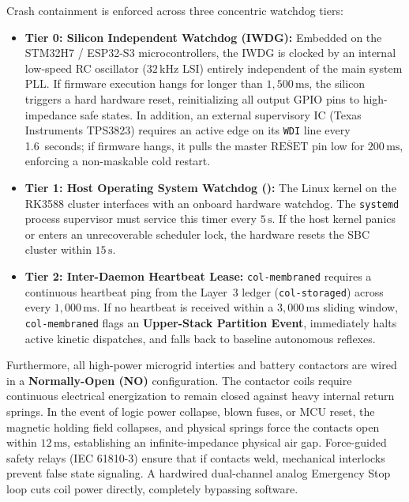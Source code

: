 Crash containment is enforced across three concentric watchdog tiers:
\begin{itemize}
    \item \textbf{Tier 0: Silicon Independent Watchdog (IWDG):} Embedded on the STM32H7 / ESP32-S3 microcontrollers, the IWDG is clocked by an internal low-speed RC oscillator ($32\,\mathrm{kHz}$ LSI) entirely independent of the main system PLL. If firmware execution hangs for longer than $1,500\,\mathrm{ms}$, the silicon triggers a hard hardware reset, reinitializing all output GPIO pins to high-impedance safe states. In addition, an external supervisory IC (Texas Instruments TPS3823) requires an active edge on its \texttt{WDI} line every 1.6~seconds; if firmware hangs, it pulls the master $\overline{\mathrm{RESET}}$ pin low for $200\,\mathrm{ms}$, enforcing a non-maskable cold restart.
    \item \textbf{Tier 1: Host Operating System Watchdog ():} The Linux kernel on the RK3588 cluster interfaces with an onboard hardware watchdog. The \texttt{systemd} process supervisor must service this timer every $5\,\mathrm{s}$. If the host kernel panics or enters an unrecoverable scheduler lock, the hardware resets the SBC cluster within $15\,\mathrm{s}$.
    \item \textbf{Tier 2: Inter-Daemon Heartbeat Lease:} \texttt{col-membraned} requires a continuous heartbeat ping from the Layer~3 ledger (\texttt{col-storaged}) across  every $1,000\,\mathrm{ms}$. If no heartbeat is received within a $3,000\,\mathrm{ms}$ sliding window, \texttt{col-membraned} flags an \textbf{Upper-Stack Partition Event}, immediately halts active kinetic dispatches, and falls back to baseline autonomous reflexes.
\end{itemize}

Furthermore, all high-power microgrid interties and battery contactors are wired in a \textbf{Normally-Open (NO)} configuration. The contactor coils require continuous electrical energization to remain closed against heavy internal return springs. In the event of logic power collapse, blown fuses, or MCU reset, the magnetic holding field collapses, and physical springs force the contacts open within $12\,\mathrm{ms}$, establishing an infinite-impedance physical air gap. Force-guided safety relays (IEC 61810-3) \parencite{iec61810_3} ensure that if contacts weld, mechanical interlocks prevent false state signaling. A hardwired dual-channel analog Emergency Stop loop cuts coil power directly, completely bypassing software.

